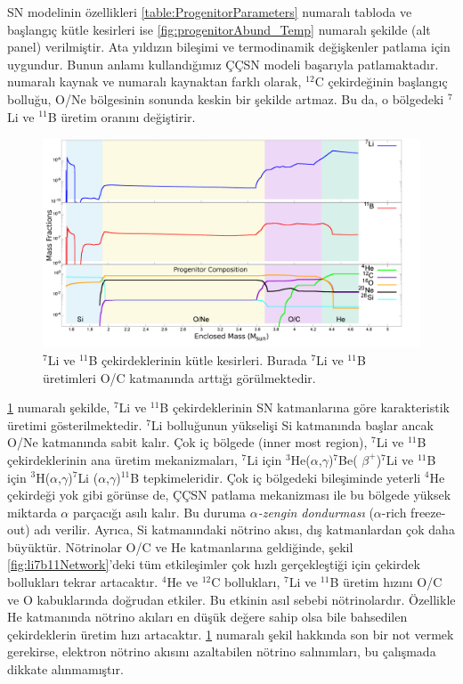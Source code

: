 SN modelinin özellikleri \ref{table:ProgenitorParameters} numaralı tabloda ve başlangıç kütle kesirleri ise \ref{fig:progenitorAbund_Temp} numaralı şekilde (alt panel) verilmiştir. Ata yıldızın bileşimi ve termodinamik değişkenler patlama için uygundur. Bunun anlamı kullandığımız ÇÇSN modeli başarıyla patlamaktadır. \cite{Sieverding:2018rdt} numaralı kaynak ve \cite{Kusakabe:2019znq} numaralı kaynaktan farklı olarak, $ ^{12} $C çekirdeğinin başlangıç bolluğu, O/Ne bölgesinin sonunda keskin bir şekilde artmaz. Bu da, o bölgedeki $ ^{7} $Li ve $ ^{11} $B üretim oranını değiştirir.
\begin{figure}[hbt!]
    \centering
    \includegraphics[width=\textwidth]{figures/abundadecay_li7b11}
    \caption[$ ^{7} $Li ve $ ^{11} $B Çekirdeklerinin Kütle Kesirleri.]{$ ^{7} $Li ve $ ^{11} $B çekirdeklerinin kütle kesirleri. Burada $ ^{7} $Li ve $ ^{11} $B üretimleri O/C katmanında arttığı görülmektedir.}\label{fig:abundadecay_li7b11}
\end{figure}

\ref{fig:abundadecay_li7b11} numaralı şekilde, $ ^{7} $Li ve $ ^{11} $B çekirdeklerinin SN katmanlarına göre karakteristik üretimi gösterilmektedir. $ ^{7} $Li bolluğunun yükselişi Si katmanında başlar ancak O/Ne katmanında sabit kalır. Çok iç bölgede (inner most region), $ ^{7} $Li ve $ ^{11} $B çekirdeklerinin ana üretim mekanizmaları, $ ^{7} $Li için $ ^{3} $He($ \alpha $,$\gamma$)$ ^{7} $Be( $ \beta^{+} $)$ ^{7} $Li ve $ ^{11} $B için $ ^{3} $H($ \alpha $,$ \gamma $)$ ^{7} $Li ($ \alpha $,$ \gamma $)$ ^{11} $B tepkimeleridir. Çok iç bölgedeki bileşiminde yeterli $ ^{4} $He çekirdeği yok gibi görünse de, ÇÇSN patlama mekanizması ile bu bölgede yüksek miktarda $ \alpha $ parçacığı asılı kalır. Bu duruma \emph{$ \alpha $-zengin dondurması} ($\alpha$-rich freeze-out) adı verilir. Ayrıca, Si katmanındaki nötrino akısı, dış katmanlardan çok daha büyüktür. Nötrinolar O/C ve He katmanlarına geldiğinde, şekil \ref{fig:li7b11Network}'deki tüm etkileşimler çok hızlı gerçekleştiği için çekirdek bollukları tekrar artacaktır. $ ^{4} $He ve $ ^{12} $C bollukları, $ ^{7} $Li ve $ ^{11} $B üretim hızını O/C ve O kabuklarında doğrudan etkiler. Bu etkinin asıl sebebi nötrinolardır. Özellikle He katmanında nötrino akıları en düşük değere sahip olsa bile bahsedilen çekirdeklerin üretim hızı artacaktır. \ref{fig:abundadecay_li7b11} numaralı şekil hakkında son bir not vermek gerekirse, elektron nötrino akısını azaltabilen nötrino salınımları, bu çalışmada dikkate alınmamıştır. 

